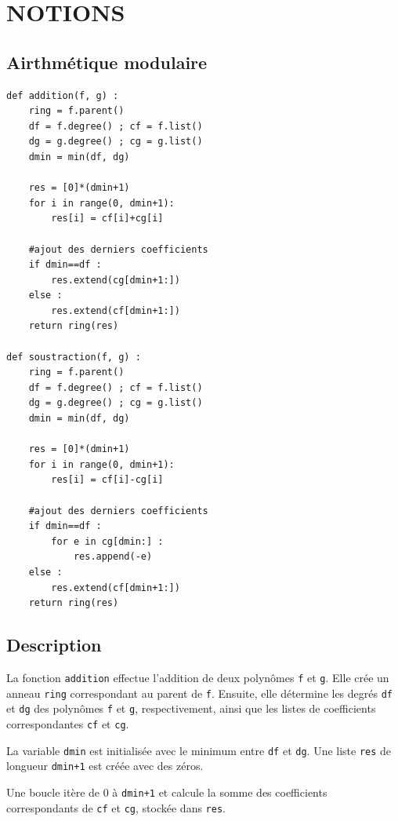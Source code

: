 \documentclass[a4paper]{article}
\begin{document}
\section{NOTIONS}

\subsection{Airthmétique modulaire}

\begin{lstlisting}[frame=leftline, title={addition et soustraction}]
def addition(f, g) :
    ring = f.parent()
    df = f.degree() ; cf = f.list()
    dg = g.degree() ; cg = g.list()
    dmin = min(df, dg)

    res = [0]*(dmin+1)
    for i in range(0, dmin+1):
        res[i] = cf[i]+cg[i]

    #ajout des derniers coefficients
    if dmin==df :
        res.extend(cg[dmin+1:])
    else :
        res.extend(cf[dmin+1:])
    return ring(res)

def soustraction(f, g) :
    ring = f.parent()
    df = f.degree() ; cf = f.list()
    dg = g.degree() ; cg = g.list()
    dmin = min(df, dg)

    res = [0]*(dmin+1)
    for i in range(0, dmin+1):
        res[i] = cf[i]-cg[i]

    #ajout des derniers coefficients
    if dmin==df :
        for e in cg[dmin:] :
            res.append(-e)
    else :
        res.extend(cf[dmin+1:])
    return ring(res)
\end{lstlisting}

\subsection*{Description}

La fonction \texttt{addition} effectue l'addition de deux polynômes \texttt{f} et \texttt{g}. Elle crée un anneau \texttt{ring} correspondant au parent de \texttt{f}. Ensuite, elle détermine les degrés \texttt{df} et \texttt{dg} des polynômes \texttt{f} et \texttt{g}, respectivement, ainsi que les listes de coefficients correspondantes \texttt{cf} et \texttt{cg}.

La variable \texttt{dmin} est initialisée avec le minimum entre \texttt{df} et \texttt{dg}. Une liste \texttt{res} de longueur \texttt{dmin+1} est créée avec des zéros.

Une boucle itère de 0 à \texttt{dmin+1} et calcule la somme des coefficients correspondants de \texttt{cf} et \texttt{cg}, stockée dans \texttt{res}.
\end{document}
